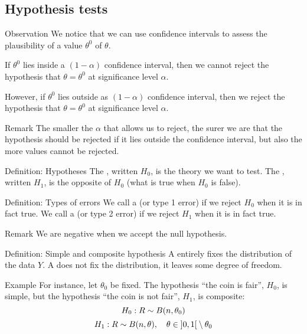 \documentclass[a4paper]{article}
\begin{document}
\subsection{Hypothesis tests}

\begin{parag}{Observation}
    We notice that we can use confidence intervals to assess the plausibility of a value $\theta^{0}$ of $\theta$. 

    If $\theta^{0}$ lies inside a $\left(1- \alpha\right)$ confidence interval, then we cannot reject the hypothesis that $\theta = \theta^0$ at significance level $\alpha$. 

    However, if $\theta^0$ lies outside as $\left(1 - \alpha\right)$ confidence interval, then we reject the hypothesis that $\theta = \theta^0$ at significance level $\alpha$.

    \begin{subparag}{Remark}
        The smaller the $\alpha$ that allows us to reject, the surer we are that the hypothesis should be rejected if it lies outside the confidence interval, but also the more values cannot be rejected.
    \end{subparag}
\end{parag}

\begin{parag}{Definition: Hypotheses}
    The , written $H_0$, is the theory we want to test. The , written $H_1$, is the opposite of $H_0$ (what is true when $H_0$ is false).
\end{parag}

\begin{parag}{Definition: Types of errors}
    We call a  (or type 1 error) if we reject $H_0$ when it is in fact true. We call a  (or type 2 error) if we reject $H_1$ when it is in fact true.

    \begin{subparag}{Remark}
        We are negative when we accept the null hypothesis.
    \end{subparag}
\end{parag}

\begin{parag}{Definition: Simple and composite hypothesis}
    A  entirely fixes the distribution of the data $Y$. A  does not fix the distribution, it leaves some degree of freedom.

    \begin{subparag}{Example}
        For instance, let $\theta_0$ be fixed. The hypothesis ``the coin is fair'', $H_0$, is simple, but the hypothesis ``the coin is not fair'', $H_1$, is composite: 
        \[H_0: R \followsdistr B\left(n, \theta_0\right)\] 
        \[H_1 : R \followsdistr B\left(n, \theta\right), \mathspace \theta \in \left]0, 1\right[ \setminus \theta_0\]
    \end{subparag}
\end{parag}
\end{document}
